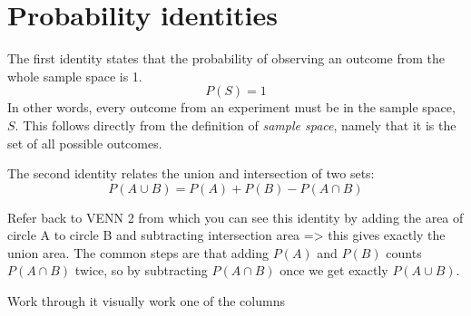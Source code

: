 \documentclass[a4paper,11pt]{report}
\begin{document}
\section{Probability identities}
The first identity states that the probability of observing an outcome
from the whole sample space is 1.
\[P(S)=1\]
In other words, every outcome from an experiment must be in the sample
space, $S$. This follows directly from the definition of {\em sample
  space}, namely that it is the set of all possible outcomes.

The second identity relates the union and intersection of two sets:
\[P(A \cup B) = P(A) + P(B) - P(A \cap B)\]

Refer back to VENN 2 from which you can see this identity by adding
the area of circle A to circle B and subtracting intersection area =>
this gives exactly the union area. The common steps are that adding
\(P(A)\) and \(P(B)\) counts \(P(A \cap B)\) twice, so by subtracting
\(P(A \cap B)\) once we get exactly \(P(A \cup B)\).

Work through it visually work one of the columns
\end{document}
